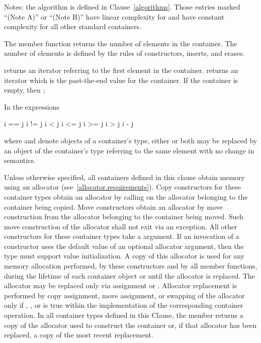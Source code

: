 Notes: the algorithm
is defined in Clause~\ref{algorithms}.
Those entries marked ``(Note A)'' or ``(Note B)''
have linear complexity for  and have constant complexity
for all other standard containers.

\pnum
The member function  returns the number of elements in the container.
The number of elements is defined by the rules of
constructors, inserts, and erases.

\pnum
{}
returns an iterator referring to the first element in the container.
returns an iterator which is the past-the-end value for the container.
If the container is empty, then
;

\pnum
In the expressions
\begin{codeblock}
i == j
i != j
i < j
i <= j
i >= j
i > j
i - j
\end{codeblock}
where  and  denote objects of a container's 
type, either or both may be replaced by an object of the container's
 type referring to the same element with no change in semantics.

\pnum
Unless otherwise specified, all containers defined in this clause obtain memory
using an allocator (see~\ref{allocator.requirements}).
Copy constructors for these container types obtain an allocator by calling
on the allocator belonging to the container being copied.
Move constructors obtain an allocator by move construction from the allocator belonging to
the container being moved. Such move construction of the allocator shall not exit via an
exception.
All other constructors for these container types take a
 argument.
\enternote If an invocation of a constructor uses the default value of an optional
allocator argument, then the  type must support value initialization.
\exitnote
A copy of this allocator is used for any memory allocation performed, by these
constructors and by all member functions, during the lifetime of each container object
or until the allocator is replaced. The allocator may be replaced only via assignment or
. Allocator replacement is performed by
copy assignment, move assignment, or swapping of the allocator only if
,
,
or  is true
within the implementation of the corresponding container operation.
In all container types defined in this Clause, the member 
returns a copy of the allocator used to construct the container or, if that allocator
has been replaced, a copy of the most recent replacement.

